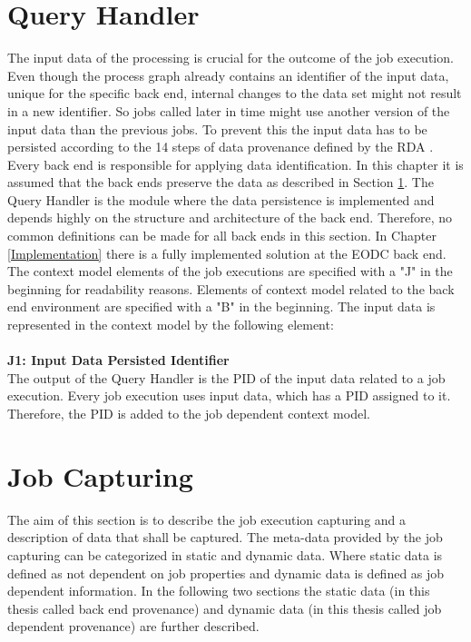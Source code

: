 \documentclass[draft,final]{vutinfth} %
\begin{document}
\section{Query Handler}\label{Design:Data Identification}
The input data of the processing is crucial for the outcome of the job execution. Even though the process graph already contains an identifier of the input data, unique for the specific back end, internal changes to the data set might not result in a new identifier. So jobs called later in time might use another version of the input data than the previous jobs. To prevent this the input data has to be persisted according to the 14 steps of data provenance defined by the RDA \cite{rauber2016identification}. Every back end is responsible for applying data identification. In this chapter it is assumed that the back ends preserve the data as described in Section \ref{Design:Data Identification}. The Query Handler is the module where the data persistence is implemented and depends highly on the structure and architecture of the back end. Therefore, no common definitions can be made for all back ends in this section. In Chapter \ref{Implementation} there is a fully implemented solution at the EODC back end. The context model elements of the job executions are specified with a "J" in the beginning for readability reasons. Elements of context model related to the back end environment are specified with a "B" in the beginning. The input data is represented in the context model by the following element: \\
\\
\textbf{J1: Input Data Persisted Identifier} \\
The output of the Query Handler is the PID of the input data related to a job execution. Every job execution uses input data, which has a PID assigned to it. Therefore, the PID is added to the job dependent context model. 

\section{Job Capturing}\label{Design:Job Capturing}
The aim of this section is to describe the job execution capturing and a description of data that shall be captured. The meta-data provided by the job capturing can be categorized in static and dynamic data. Where static data is defined as not dependent on job properties and dynamic data is defined as job dependent information. In the following two sections the static data (in this thesis called back end provenance) and dynamic data (in this thesis called job dependent provenance) are further described.     
\end{document}
